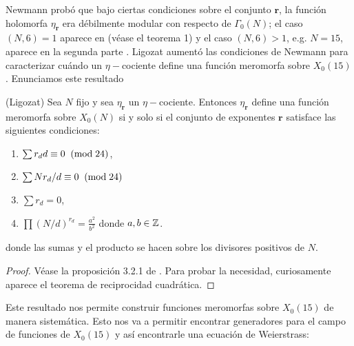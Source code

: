 Newmann probó que bajo ciertas condiciones sobre el conjunto $\mathbf{r}$, la función holomorfa $\eta_\mathbf{r}$ era débilmente modular con respecto de $\Gamma_0(N)$; el caso $(N,6)=1$ aparece en \cite{NewmanCAAOACOMFI} (véase el teorema 1) y el caso $(N,6)>1$, e.g. $N=15$, aparece en la segunda parte \cite{NewmanCAAOACOMFII}. Ligozat aumentó las condiciones de Newmann para caracterizar cuándo un $\eta-$cociente define una función meromorfa sobre $X_0(15)$. Enunciamos este resultado

\begin{thm}\label{thm:ligozats}
	(Ligozat) Sea $N$ fijo y sea $\eta_\mathbf{r}$ un $\eta-$cociente. Entonces $\eta_\mathbf{r}$ define una función meromorfa sobre $X_0(N)$ si y solo si el conjunto de exponentes $\mathbf{r}$ satisface las siguientes condiciones:
	\begin{enumerate}[label=(\roman*)]
		\item $\sum r_d d \equiv 0 \;\;(\mathrm{mod}\; 24)$,
		\item $\sum N r_d/d\equiv0\;\;(\mathrm{mod}\; 24)$
		\item $\sum r_d=0$,
		\item $\prod (N/d)^{r_d}=\frac{a^2}{b^2}$ donde $a,b\in\mathbb{Z}$.
	\end{enumerate}
	donde las sumas y el producto se hacen sobre los divisores positivos de $N$.
\end{thm}
\begin{proof}
	Véase la proposición 3.2.1 de \cite{LigozatCMDG1}. Para probar la necesidad, curiosamente aparece el teorema de reciprocidad cuadrática.
\end{proof}

Este resultado nos permite construir funciones meromorfas sobre $X_0(15)$ de manera sistemática. Esto nos va a permitir encontrar generadores para el campo de funciones de $X_0(15)$ y así encontrarle una ecuación de Weierstrass:

